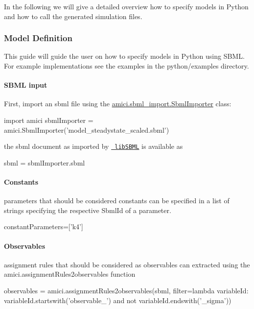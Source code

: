 In the following we will give a detailed overview how to specify models in Python and how to call the generated simulation files.

\subsubsection*{Model Definition}

This guide will guide the user on how to specify models in Python using S\+B\+ML. For example implementations see the examples in the python/examples directory.

\paragraph*{S\+B\+ML input}

First, import an sbml file using the {\ttfamily \mbox{\hyperlink{classamici_1_1sbml__import_1_1_sbml_importer}{amici.\+sbml\+\_\+import.\+Sbml\+Importer}}} class\+: \begin{DoxyVerb}import amici
sbmlImporter = amici.SbmlImporter('model_steadystate_scaled.sbml')
\end{DoxyVerb}


the sbml document as imported by \href{http://sbml.org/Software/libSBML}{\texttt{ lib\+S\+B\+ML}} is available as \begin{DoxyVerb}sbml = sbmlImporter.sbml
\end{DoxyVerb}


\paragraph*{Constants}

parameters that should be considered constants can be specified in a list of strings specifying the respective Sbml\+Id of a parameter. \begin{DoxyVerb}constantParameters=['k4']
\end{DoxyVerb}


\paragraph*{Observables}

assignment rules that should be considered as observables can extracted using the {\ttfamily amici.\+assignment\+Rules2observables} function \begin{DoxyVerb}observables = amici.assignmentRules2observables(sbml, filter=lambda variableId: 
                                                variableId.startswith('observable_') and not variableId.endswith('_sigma'))
\end{DoxyVerb}


